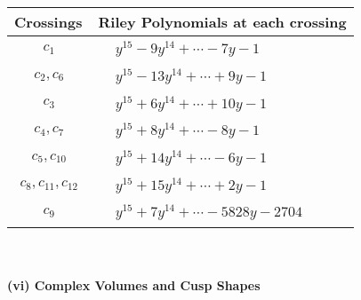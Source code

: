 \documentclass[1p]{elsarticle_modified}
\theoremstyle{definition}
\begin{document}
\begin{tabular}{m{50pt}|m{274pt}}
Crossings & \hspace{64pt}Riley Polynomials at each crossing \\
\hline $$\begin{aligned}c_{1}\end{aligned}$$&$\begin{aligned}
&y^{15}-9 y^{14}+\cdots-7 y-1
\end{aligned}$\\
\hline $$\begin{aligned}c_{2},c_{6}\end{aligned}$$&$\begin{aligned}
&y^{15}-13 y^{14}+\cdots+9 y-1
\end{aligned}$\\
\hline $$\begin{aligned}c_{3}\end{aligned}$$&$\begin{aligned}
&y^{15}+6 y^{14}+\cdots+10 y-1
\end{aligned}$\\
\hline $$\begin{aligned}c_{4},c_{7}\end{aligned}$$&$\begin{aligned}
&y^{15}+8 y^{14}+\cdots-8 y-1
\end{aligned}$\\
\hline $$\begin{aligned}c_{5},c_{10}\end{aligned}$$&$\begin{aligned}
&y^{15}+14 y^{14}+\cdots-6 y-1
\end{aligned}$\\
\hline $$\begin{aligned}c_{8},c_{11},c_{12}\end{aligned}$$&$\begin{aligned}
&y^{15}+15 y^{14}+\cdots+2 y-1
\end{aligned}$\\
\hline $$\begin{aligned}c_{9}\end{aligned}$$&$\begin{aligned}
&y^{15}+7 y^{14}+\cdots-5828 y-2704
\end{aligned}$\\
\hline
\end{tabular}\\~\\
\newpage\flushleft \textbf{(vi) Complex Volumes and Cusp Shapes}
\end{document}
